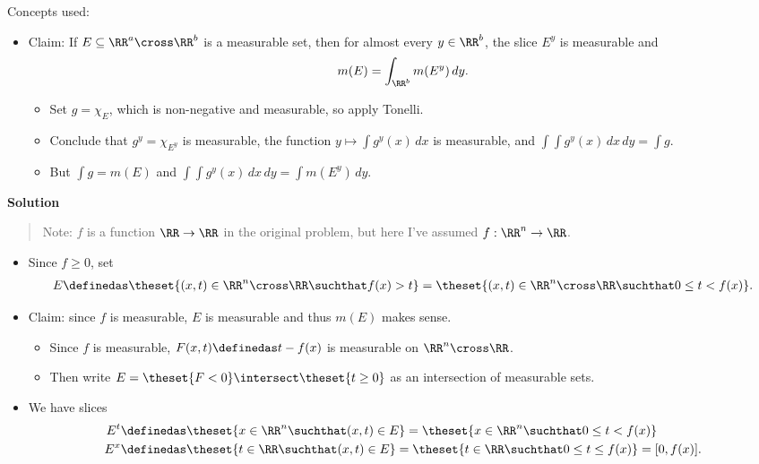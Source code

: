 \begin{solution}

Concepts used:

\begin{itemize}
\tightlist
\item
  Claim: If \(E\subseteq \RR^a \cross \RR^b\) is a measurable set, then
  for almost every \(y\in \RR^b\), the slice \(E^y\) is measurable and
  \begin{align*}
  m(E) = \int_{\RR^b} m(E^y) \,dy
  .\end{align*}

  \begin{itemize}
  \tightlist
  \item
    Set \(g = \chi_E\), which is non-negative and measurable, so apply
    Tonelli.
  \item
    Conclude that \(g^y = \chi_{E^y}\) is measurable, the function
    \(y\mapsto \int g^y(x)\, dx\) is measurable, and
    \(\int \int g^y(x)\,dx \,dy = \int g\).
  \item
    But \(\int g = m(E)\) and
    \(\int\int g^y(x) \,dx\,dy = \int m(E^y)\,dy\).
  \end{itemize}
\end{itemize}

\textbf{Solution}

\begin{quote}
Note: \(f\) is a function \(\RR\to \RR\) in the original problem, but
here I've assumed \(f:\RR^n\to \RR\).
\end{quote}

\begin{itemize}
\item
  Since \(f\geq 0\), set
  \begin{align*}
  E\definedas \theset{(x, t) \in \RR^{n} \cross \RR \suchthat f(x) > t}
  = \theset{(x, t) \in \RR^n \cross \RR \suchthat 0 \leq t < f(x)}
  .\end{align*}
\item
  Claim: since \(f\) is measurable, \(E\) is measurable and thus
  \(m(E)\) makes sense.

  \begin{itemize}
  \tightlist
  \item
    Since \(f\) is measurable, \(F(x, t) \definedas t - f(x)\) is
    measurable on \(\RR^n \cross \RR\).
  \item
    Then write \(E = \theset{F < 0} \intersect \theset{t\geq 0}\) as an
    intersection of measurable sets.
  \end{itemize}
\item
  We have slices \begin{align*}
  E^t &\definedas \theset{x\in \RR^n \suchthat (x, t) \in E} = \theset{x\in \RR^n \suchthat 0 \leq t < f(x)} \\
  E^x &\definedas \theset{t\in \RR \suchthat (x, t) \in E} = \theset{t\in \RR \suchthat 0 \leq t \leq f(x)} = [0, f(x)]
  .\end{align*}


\end{itemize}
\end{solution}
